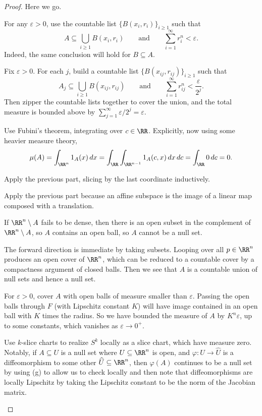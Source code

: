 \documentclass[../notes.tex]{subfiles}
\begin{document}
\begin{proof}
	Here we go.
	\begin{listalph}
		\item For any $\varepsilon>0$, use the countable list $\{B(x_i,r_i)\}_{i\ge1}$ such that
		\[A\subseteq\bigcup_{i\ge1}B(x_i,r_i)\qquad\text{and}\qquad\sum_{i=1}^\infty r_i^n<\varepsilon.\]
		Indeed, the same conclusion will hold for $B\subseteq A$.
		\item Fix $\varepsilon>0$. For each $j$, build a countable list $\{B(x_{ij},r_{ij})\}_{i\ge1}$ such that
		\[A_j\subseteq\bigcup_{i\ge1}B(x_{ij},r_{ij})\qquad\text{and}\qquad\sum_{i=1}^\infty r_{ij}^n<\frac{\varepsilon}{2^j}.\]
		Then zipper the countable lists together to cover the union, and the total measure is bounded above by $\sum_{j=1}^\infty\varepsilon/2^j=\varepsilon$.
		\item Use Fubini's theorem, integrating over $c\in\RR$. Explicitly, now using some heavier measure theory,
		\[\mu(A)=\int_{\RR^n}1_A(x)\,dx=\int_\RR\int_{\RR^{n-1}}1_A(c,x)\,dx\,dc=\int_\RR0\,dc=0.\]
		\item Apply the previous part, slicing by the last coordinate inductively.
		\item Apply the previous part because an affine subspace is the image of a linear map composed with a translation.
		\item If $\RR^n\setminus A$ fails to be dense, then there is an open subset in the complement of $\RR^n\setminus A$, so $A$ contains an open ball, so $A$ cannot be a null set.
		\item The forward direction is immediate by taking subsets. Looping over all $p\in\RR^n$ produces an open cover of $\RR^n$, which can be reduced to a countable cover by a compactness argument of closed balls. Then we see that $A$ is a countable union of null sets and hence a null set.
		\item For $\varepsilon>0$, cover $A$ with open balls of measure smaller than $\varepsilon$. Passing the open balls through $F$ (with Lipschitz constant $K$) will have image contained in an open ball with $K$ times the radius. So we have bounded the measure of $A$ by $K^n\varepsilon$, up to some constants, which vanishes as $\varepsilon\to0^+$.
		\item Use $k$-slice charts to realize $S^k$ locally as a slice chart, which have measure zero. Notably, if $A\subseteq U$ is a null set where $U\subseteq\RR^n$ is open, and $\varphi\colon U\to\widehat U$ is a diffeomorphism to some other $\widehat U\subseteq\RR^n$, then $\varphi(A)$ continues to be a null set by using (g) to allow us to check locally and then note that diffeomorphisms are locally Lipschitz by taking the Lipschitz constant to be the norm of the Jacobian matrix.
		\qedhere
	\end{listalph}
\end{proof}
\end{document}
